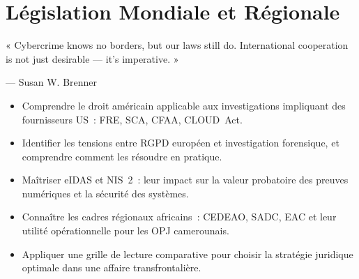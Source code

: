 
\chapter{Législation Mondiale et Régionale}
\label{chap:leg-mond}

\epigraph{%
    « Cybercrime knows no borders, but our laws still do.
    International cooperation is not just desirable --- it's imperative. »%
}{--- Susan W. Brenner}


\begin{boxobjectifs}
\begin{itemize}
    \item Comprendre le droit américain applicable aux investigations
          impliquant des fournisseurs US~: FRE, SCA, CFAA, CLOUD~Act.
    \item Identifier les tensions entre RGPD européen et investigation
          forensique, et comprendre comment les résoudre en pratique.
    \item Maîtriser eIDAS et NIS~2~: leur impact sur la valeur probatoire
          des preuves numériques et la sécurité des systèmes.
    \item Connaître les cadres régionaux africains~: CEDEAO, SADC, EAC
          et leur utilité opérationnelle pour les OPJ camerounais.
    \item Appliquer une grille de lecture comparative pour choisir
          la stratégie juridique optimale dans une affaire transfrontalière.
\end{itemize}
\end{boxobjectifs}

